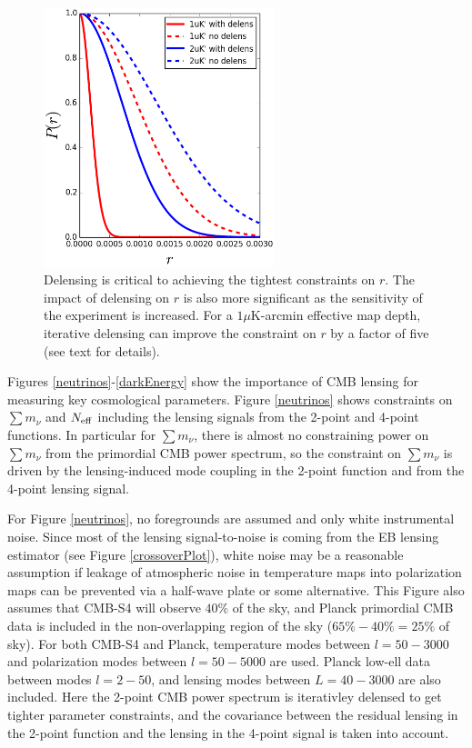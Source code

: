 \documentclass{tcibook}
\begin{document}
\begin{figure}[ht]
\centering
\includegraphics[width=0.6\textwidth]{sigma-r.png}
\caption{Delensing is critical to achieving the tightest constraints on $r$.  The impact of delensing on $r$ is also more significant as the sensitivity of the experiment is increased. For a $1 \mu $K-arcmin effective map depth, iterative delensing can improve the constraint on $r$ by a factor of five (see text for details).}
\label{inflation}
\end{figure}


Figures \ref{neutrinos}-\ref{darkEnergy} show the importance of CMB lensing for measuring key cosmological parameters.  Figure \ref{neutrinos} shows constraints on $\sum {m_\nu}$ and $N_{\rm{eff}}$ including the lensing signals from the 2-point and 4-point functions.  In particular for $\sum {m_\nu}$, there is almost no constraining power on $\sum {m_\nu}$ from the primordial CMB power spectrum, so the constraint on $\sum {m_\nu}$ is driven by the lensing-induced mode coupling in the 2-point function and from the 4-point lensing signal.  

For Figure \ref{neutrinos}, no foregrounds are assumed and only white instrumental noise.  Since most of the lensing signal-to-noise is coming from the EB lensing estimator (see Figure \ref{crossoverPlot}), white noise may be a reasonable assumption if leakage of atmospheric noise in temperature maps into polarization maps can be prevented via a half-wave plate or some alternative.  This Figure also assumes that CMB-S4 will observe $40\%$ of the sky, and Planck primordial CMB data is included in the non-overlapping region of the sky ($65\% - 40\% = 25\%$ of sky).  For both CMB-S4 and Planck, temperature modes between $l=50-3000$ and polarization modes between $l=50-5000$ are used.  Planck low-ell data between modes $l=2-50$, and lensing modes between $L=40-3000$ are also included.  Here the 2-point CMB power spectrum is iterativley delensed to get tighter parameter constraints, and the covariance between the residual lensing in the 2-point function and the lensing in the 4-point signal is taken into account.     
\end{document}
